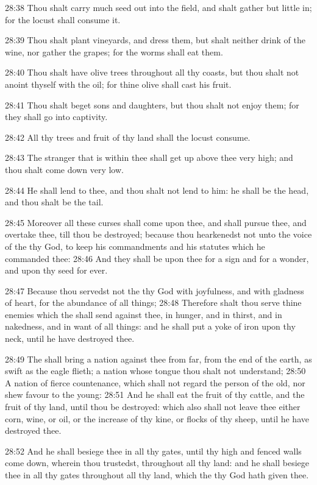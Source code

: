 28:38 Thou shalt carry much seed out into the field, and shalt gather but little in; for the locust shall consume it.

28:39 Thou shalt plant vineyards, and dress them, but shalt neither drink of the wine, nor gather the grapes; for the worms shall eat them.

28:40 Thou shalt have olive trees throughout all thy coasts, but thou shalt not anoint thyself with the oil; for thine olive shall cast his fruit.

28:41 Thou shalt beget sons and daughters, but thou shalt not enjoy them; for they shall go into captivity.

28:42 All thy trees and fruit of thy land shall the locust consume.

28:43 The stranger that is within thee shall get up above thee very high; and thou shalt come down very low.

28:44 He shall lend to thee, and thou shalt not lend to him: he shall be the head, and thou shalt be the tail.

28:45 Moreover all these curses shall come upon thee, and shall pursue thee, and overtake thee, till thou be destroyed; because thou hearkenedst not unto the voice of the \LORD thy God, to keep his commandments and his statutes which he commanded thee: 28:46 And they shall be upon thee for a sign and for a wonder, and upon thy seed for ever.

28:47 Because thou servedst not the \LORD thy God with joyfulness, and with gladness of heart, for the abundance of all things; 28:48 Therefore shalt thou serve thine enemies which the \LORD shall send against thee, in hunger, and in thirst, and in nakedness, and in want of all things: and he shall put a yoke of iron upon thy neck, until he have destroyed thee.

28:49 The \LORD shall bring a nation against thee from far, from the end of the earth, as swift as the eagle flieth; a nation whose tongue thou shalt not understand; 28:50 A nation of fierce countenance, which shall not regard the person of the old, nor shew favour to the young: 28:51 And he shall eat the fruit of thy cattle, and the fruit of thy land, until thou be destroyed: which also shall not leave thee either corn, wine, or oil, or the increase of thy kine, or flocks of thy sheep, until he have destroyed thee.

28:52 And he shall besiege thee in all thy gates, until thy high and fenced walls come down, wherein thou trustedst, throughout all thy land: and he shall besiege thee in all thy gates throughout all thy land, which the \LORD thy God hath given thee.

